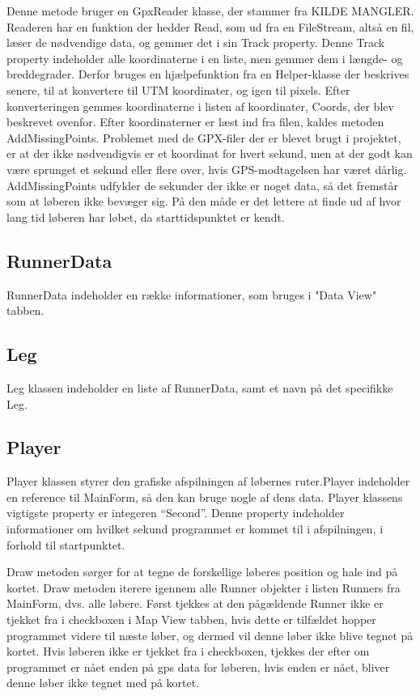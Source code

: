 Denne metode bruger en GpxReader klasse, der stammer fra KILDE MANGLER. Readeren har en funktion der hedder Read, som ud fra en FileStream, altså en fil, læser de nødvendige data, og gemmer det i sin Track property. Denne Track property indeholder alle koordinaterne i en liste, men gemmer dem i længde- og breddegrader. Derfor bruges en hjælpefunktion fra en Helper-klasse der beskrives senere, til at konvertere til UTM koordinater, og igen til pixels. Efter konverteringen gemmes koordinaterne i listen af koordinater, Coords, der blev beskrevet ovenfor. 
Efter koordinaterner er læst ind fra filen, kaldes metoden AddMissingPoints. Problemet med de GPX-filer der er blevet brugt i projektet, er at der ikke nødvendigvis er et koordinat for hvert sekund, men at der godt kan være sprunget et sekund eller flere over, hvis GPS-modtagelsen har været dårlig. AddMissingPoints udfylder de sekunder der ikke er noget data, så det fremstår som at løberen ikke bevæger sig. På den måde er det lettere at finde ud af hvor lang tid løberen har løbet, da starttidspunktet er kendt. 
\subsection{RunnerData}
RunnerData indeholder en række informationer, som bruges i "Data View" tabben.

\subsection{Leg}
Leg klassen indeholder en liste af RunnerData, samt et navn på det specifikke Leg.
\subsection{Player}
Player klassen styrer den grafiske afspilningen af løbernes ruter.Player indeholder en reference til MainForm, så den kan bruge nogle af dens data. \newline
Player klassens vigtigste property er integeren “Second”. Denne property indeholder informationer om hvilket sekund programmet er kommet til i afspilningen, i forhold til startpunktet. 

Draw metoden sørger for at tegne de forskellige løberes position og hale ind på kortet.
Draw metoden iterere igennem alle Runner objekter i listen Runners fra MainForm, dvs. alle løbere.\newline
Først tjekkes at den pågældende Runner ikke er tjekket fra i checkboxen i Map View tabben, hvis dette er tilfældet hopper programmet videre til næste løber, og dermed vil denne løber ikke blive tegnet på kortet. \newline
Hvis løberen ikke er tjekket fra i checkboxen, tjekkes der efter om programmet er nået enden på gps data for løberen, hvis enden er nået, bliver denne løber ikke tegnet med på kortet.

